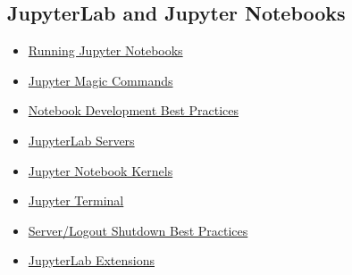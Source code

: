 \subsection{JupyterLab and Jupyter Notebooks}

\begin{itemize}
\item \href{/how-to-run-a-notebook}{Running Jupyter Notebooks}
\item \href{/jupyter-magic}{Jupyter Magic Commands}
\item \href{/class-notebooks-best-practices}{Notebook Development Best Practices}
\item \href{/jupyter-servers}{JupyterLab Servers}
\item \href{/jupyter-kernels}{Jupyter Notebook Kernels}
\item \href{/opensarlab-terminal}{Jupyter Terminal}
\item \href{/logging-out-and-server-shutdown}{Server/Logout Shutdown Best Practices}
\item \href{/jupyterlab-extensions}{JupyterLab Extensions}
\end{itemize}